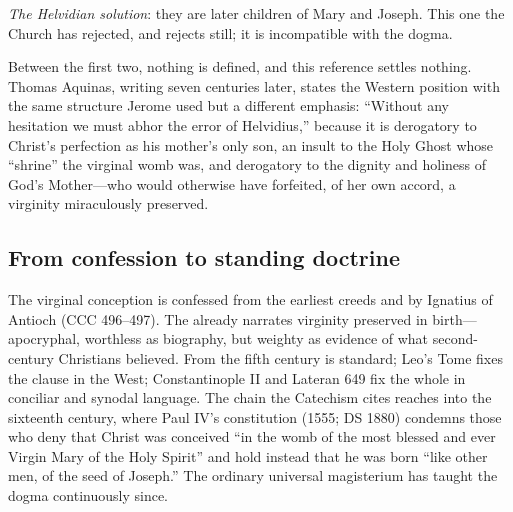 \emph{The Helvidian solution}: they are later children of Mary and
Joseph. This one the Church has rejected, and rejects still; it is
incompatible with the dogma.

Between the first two, nothing is defined, and this reference settles
nothing. Thomas Aquinas, writing seven centuries later, states the
Western position with the same structure Jerome used but a different
emphasis: ``Without any hesitation we must abhor the error of Helvidius,''
because it is derogatory to Christ's perfection as his mother's only
son, an insult to the Holy Ghost whose ``shrine'' the virginal womb was,
and derogatory to the dignity and holiness of God's Mother---who would
otherwise have forfeited, of her own accord, a virginity miraculously
preserved.

\subsection*{From confession to standing doctrine}

The virginal conception is confessed from the earliest creeds and by
Ignatius of Antioch (CCC 496--497). The 
already narrates virginity preserved in birth---apocryphal, worthless as
biography, but weighty as evidence of what second-century Christians
believed. From the fifth century  is standard; Leo's
Tome fixes the  clause in the West; Constantinople II and
Lateran 649 fix the whole in conciliar and synodal language. The chain
the Catechism cites reaches into the sixteenth century, where Paul IV's
constitution  (1555; DS 1880) condemns those
who deny that Christ was conceived ``in the womb of the most blessed and
ever Virgin Mary of the Holy Spirit'' and hold instead that he was born
``like other men, of the seed of Joseph.'' The ordinary universal magisterium has taught the
dogma continuously since.

